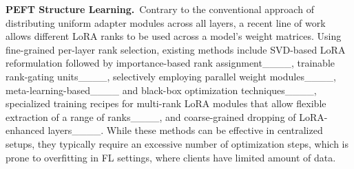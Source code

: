 \noindent\textbf{PEFT Structure Learning.}~Contrary to the conventional approach of distributing uniform adapter modules across all layers, a recent line of work allows different LoRA ranks to be used across a model's weight matrices. Using fine-grained per-layer rank selection, existing methods include SVD-based LoRA reformulation followed by importance-based rank assignment____, trainable rank-gating units____, selectively employing parallel weight modules____, meta-learning-based____ and black-box optimization techniques____, specialized training recipes for multi-rank LoRA modules that allow flexible extraction of a range of ranks____, and coarse-grained dropping of LoRA-enhanced layers____. While these methods can be effective in centralized setups, they typically require an excessive number of optimization steps, which is prone to overfitting in FL settings, where clients have limited amount of data.